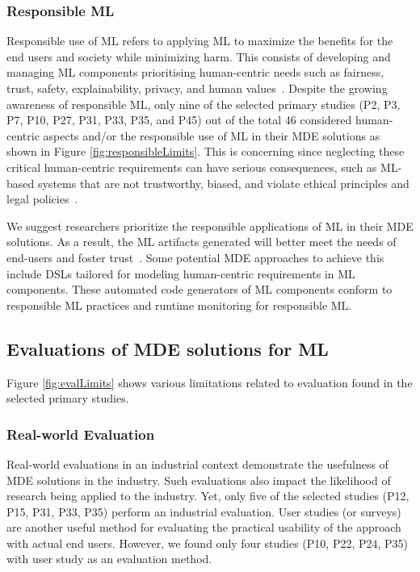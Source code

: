 \subsubsection{Responsible ML}
Responsible use of ML refers to applying ML to maximize the benefits for the end users and society while minimizing harm. This consists of developing and managing ML components prioritising human-centric needs such as fairness, trust, safety, explainability, privacy, and human values~\cite{zhu2022ai}. Despite the growing awareness of responsible ML, only nine of the selected primary studies (P2, P3, P7, P10, P27, P31, P33, P35, and P45) out of the total 46 considered human-centric aspects and/or the responsible use of ML in their MDE solutions as shown in Figure \ref{fig:responsibleLimits}. This is concerning since neglecting these critical human-centric requirements can have serious consequences, such as ML-based systems that are not trustworthy, biased, and violate ethical principles and legal policies~\cite{zhu2022ai}.

We suggest researchers prioritize the responsible applications of ML in their MDE solutions. As a result, the ML artifacts generated will better meet the needs of end-users and foster trust~\cite{zhu2022ai}. Some potential MDE approaches to achieve this include DSLs tailored for modeling human-centric requirements in ML components. These automated code generators of ML components conform to responsible ML practices and runtime monitoring for responsible ML. 

\subsection{Evaluations of MDE solutions for ML}
Figure \ref{fig:evalLimits} shows various limitations related to evaluation found in the selected primary studies.
\subsubsection{Real-world Evaluation}
Real-world evaluations in an industrial context demonstrate the usefulness of MDE solutions in the industry. Such evaluations also impact the likelihood of research being applied to the industry. Yet, only five of the selected studies (P12, P15, P31, P33, P35) perform an industrial evaluation. User studies (or surveys) are another useful method for evaluating the practical usability of the approach with actual end users. However, we found only four studies (P10, P22, P24, P35) with user study as an evaluation method.

